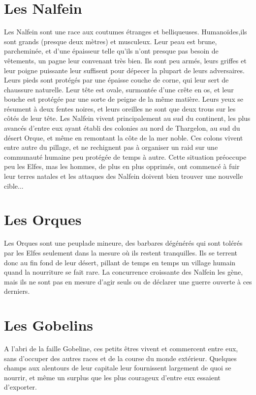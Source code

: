 \section{Les Nalfein}
Les Nalfein sont une race aux coutumes étranges et belliqueuses. Humanoïdes,ils sont grands (presque deux mètres) et musculeux. Leur peau est brune, parcheminée, et d'une épaisseur telle qu'ils n'ont presque pas besoin de vêtements, un pagne leur convenant très bien. Ils sont peu armés, leurs griffes et leur poigne puissante leur suffisent pour dépecer la plupart de leurs adversaires. Leurs pieds sont protégés par une épaisse couche de corne, qui leur sert de chaussure naturelle. Leur tête est ovale, surmontée d'une crête en os, et leur bouche est protégée par une sorte de peigne de la même matière. Leurs yeux se résument à deux fentes noires, et leurs oreilles ne sont que deux trous sur les côtés de leur tête. Les Nalfein vivent principalement au sud du continent, les plus avancés d'entre eux ayant établi des colonies au nord de Thargelon, au sud du désert Orque, et même en remontant la côte de la mer noble. Ces colons vivent entre autre du pillage, et ne rechignent pas à organiser un raid sur une communauté humaine peu protégée de temps à autre. Cette situation préoccupe peu les Elfes, mas les hommes, de plus en plus opprimés, ont commencé à fuir leur terres natales et les attaques des Nalfein doivent bien trouver une nouvelle cible...

\section{Les Orques}
Les Orques sont une peuplade mineure, des barbares dégénérés qui sont tolérés par les Elfes seulement dans la mesure où ils restent tranquilles. Ils se terrent donc au fin fond de leur désert, pillant de temps en temps un village humain quand la nourriture se fait rare. La concurrence croissante des Nalfein les gène, mais ils ne sont pas en mesure d'agir seuls ou de déclarer une guerre ouverte à ces derniers.

\section{Les Gobelins}
A l'abri de la faille Gobeline, ces petits êtres vivent et commercent entre eux, sans d'occuper des autres races et de la course du monde extérieur. Quelques champs aux alentours de leur capitale leur fournissent largement de quoi se nourrir, et même un surplus que les plus courageux d'entre eux essaient d'exporter.